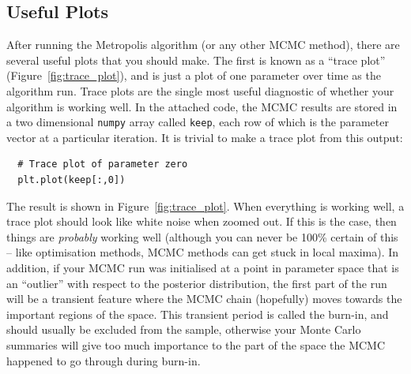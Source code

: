 \subsection{Useful Plots}
After running the Metropolis algorithm (or any other MCMC method), there are
several useful plots that you should make. The first is known as a
``trace plot'' (Figure~\ref{fig:trace_plot}),
and is just a plot of one parameter over time as the algorithm run. Trace plots
are the single most useful diagnostic of whether your algorithm is working well.
In the attached code, the MCMC results are stored in a two dimensional
{\tt numpy} array called {\tt keep}, each row of which is the parameter vector
at a particular iteration. It is trivial to make a trace plot from this output:

\begin{verbatim}
  # Trace plot of parameter zero
  plt.plot(keep[:,0])
\end{verbatim}
The result is shown in Figure~\ref{fig:trace_plot}. When everything is working
well, a trace plot should look like white noise when zoomed out. If this is the
case, then things are {\it probably} working well (although you can never be
100\% certain of this -- like optimisation methods, MCMC methods can get
stuck in local maxima). In addition, if your MCMC run was initialised at a
point in parameter space that is an ``outlier'' with respect to the posterior
distribution, the first part of the run will be a transient feature where the
MCMC chain (hopefully) moves towards the important regions of the space.
This transient period is called the burn-in, and should usually be excluded
from the sample, otherwise your Monte Carlo summaries will give too much
importance to the part of the space the MCMC happened to go through during
burn-in.

